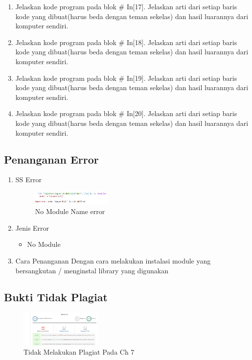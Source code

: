 \begin{enumerate}
\item Jelaskan kode program pada blok \# In[17]. Jelaskan arti dari setiap baris kode yang dibuat(harus beda dengan teman sekelas) dan hasil luarannya dari komputer sendiri.


\item Jelaskan kode program pada blok \# In[18]. Jelaskan arti dari setiap baris kode yang dibuat(harus beda dengan teman sekelas) dan hasil luarannya dari komputer sendiri.


\item Jelaskan kode program pada blok \# In[19]. Jelaskan arti dari setiap baris kode yang dibuat(harus beda dengan teman sekelas) dan hasil luarannya dari komputer sendiri.


\item Jelaskan kode program pada blok \# In[20]. Jelaskan arti dari setiap baris kode yang dibuat(harus beda dengan teman sekelas) dan hasil luarannya dari komputer sendiri.

\end{enumerate}
\subsection{Penanganan Error}
\begin{enumerate}
	\item SS Error
	\begin{figure}[H]
		\includegraphics[width=4cm]{figures/1174086/error/7.PNG}
		\centering
		\caption{No Module Name error}
	\end{figure}
	\item Jenis Error
	\begin{itemize}
		\item No Module
	\end{itemize}
	\item Cara Penanganan
	\hfill\break
	Dengan cara melakukan instalasi module yang bersangkutan / menginstal library yang digunakan
\end{enumerate}
\subsection{Bukti Tidak Plagiat}
\begin{figure}[H]
    \includegraphics[width=4cm]{figures/1174086/bukti/7.png}
    \centering
    \caption{Tidak Melakukan Plagiat Pada Ch 7}
\end{figure}